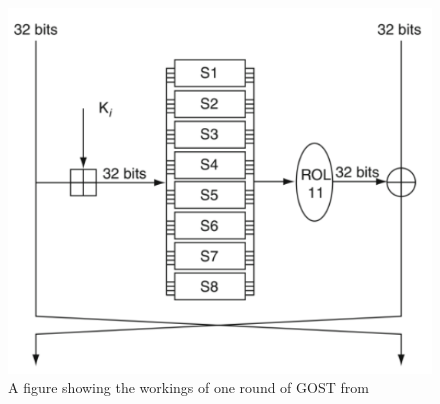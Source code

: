 \documentclass[10pt,journal,compsoc]{IEEEtran}
\begin{document}
\begin{appendices}
\begin{figure}[H]
    \centering
    \includegraphics[width=\linewidth, height=\textheight, keepaspectratio]{Figures/gost_1r.png}
    \caption{A figure showing the workings of one round of GOST from \cite{van2011encyclopedia}}
    \label{fig:gost1r}
\end{figure}


\end{appendices}
\end{document}
